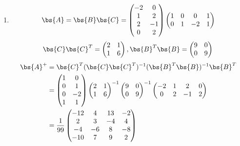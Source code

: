 \documentclass[12pt, a4paper, oneside, UTF8]{ctexbook}
\begin{document}
\begin{solution}
\begin{enumerate}[label=(\arabic*)]
        \item \begin{align*}
            \bs{A}=\bs{B}\bs{C}=\begin{pmatrix}
                -2&0\\
                1&2\\
                2&-1\\
                0&2
            \end{pmatrix}\begin{pmatrix}
                1&0&0&1\\
                0&1&-2&1
            \end{pmatrix}
        \end{align*}
        \begin{align*}
            \bs{C}\bs{C}^T=\begin{pmatrix}
                2&1\\
                1&6
            \end{pmatrix},\bs{B}^T\bs{B}=\begin{pmatrix}
                9&0\\
                0&9
            \end{pmatrix}
        \end{align*}
        \begin{align*}
            \bs{A}^+&=\bs{C}^T(\bs{C}\bs{C}^T)^{-1}(\bs{B}^T\bs{B})^{-1}\bs{B}^T\\
            &=\begin{pmatrix}
                1& 0\\
                0&1\\
                0&-2 \\
                1&1
            \end{pmatrix}\begin{pmatrix}
                2&1\\
                1&6
            \end{pmatrix}^{-1}\begin{pmatrix}
                9&0\\
                0&9
            \end{pmatrix}^{-1}\begin{pmatrix}
                -2&1&2&0\\
                0&2&-1&2
            \end{pmatrix}\\
            &=\frac{1}{99}\begin{pmatrix}
                -12&4&13&-2\\
                2&3&-4&4\\
                -4&-6&8&-8\\
                -10&7&9&2
            \end{pmatrix}
        \end{align*}
    \end{enumerate}
    
\end{solution}
\end{document}
